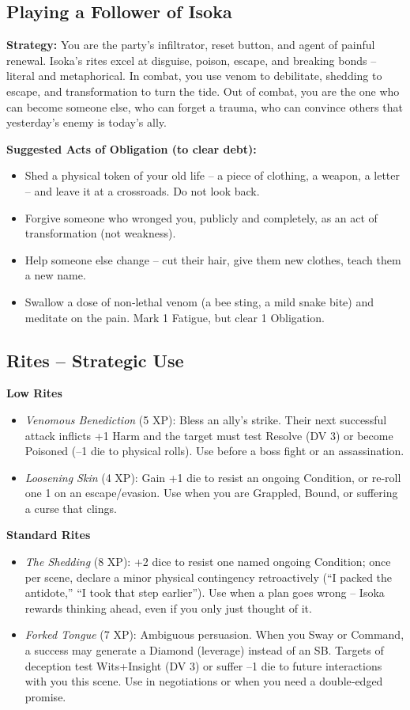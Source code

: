 \documentclass[10pt,a5paper]{book}
\begin{document}
\subsection*{Playing a Follower of Isoka}

\textbf{Strategy:} You are the party’s infiltrator, reset button, and agent of painful renewal. Isoka’s rites excel at disguise, poison, escape, and breaking bonds – literal and metaphorical. In combat, you use venom to debilitate, shedding to escape, and transformation to turn the tide. Out of combat, you are the one who can become someone else, who can forget a trauma, who can convince others that yesterday’s enemy is today’s ally.

\textbf{Suggested Acts of Obligation (to clear debt):}
\begin{itemize}
    \item Shed a physical token of your old life – a piece of clothing, a weapon, a letter – and leave it at a crossroads. Do not look back.
    \item Forgive someone who wronged you, publicly and completely, as an act of transformation (not weakness).
    \item Help someone else change – cut their hair, give them new clothes, teach them a new name.
    \item Swallow a dose of non‑lethal venom (a bee sting, a mild snake bite) and meditate on the pain. Mark 1 Fatigue, but clear 1 Obligation.
\end{itemize}

\subsection*{Rites – Strategic Use}

\textbf{Low Rites}
\begin{itemize}
    \item \textit{Venomous Benediction} (5 XP): Bless an ally’s strike. Their next successful attack inflicts +1 Harm and the target must test Resolve (DV 3) or become Poisoned (–1 die to physical rolls). Use before a boss fight or an assassination.
    \item \textit{Loosening Skin} (4 XP): Gain +1 die to resist an ongoing Condition, or re‑roll one 1 on an escape/evasion. Use when you are Grappled, Bound, or suffering a curse that clings.
\end{itemize}

\textbf{Standard Rites}
\begin{itemize}
    \item \textit{The Shedding} (8 XP): +2 dice to resist one named ongoing Condition; once per scene, declare a minor physical contingency retroactively (“I packed the antidote,” “I took that step earlier”). Use when a plan goes wrong – Isoka rewards thinking ahead, even if you only just thought of it.
    \item \textit{Forked Tongue} (7 XP): Ambiguous persuasion. When you Sway or Command, a success may generate a Diamond (leverage) instead of an SB. Targets of deception test Wits+Insight (DV 3) or suffer –1 die to future interactions with you this scene. Use in negotiations or when you need a double‑edged promise.
\end{itemize}
\end{document}
